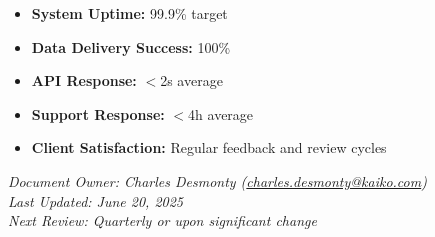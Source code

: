 \documentclass[12pt,a4paper]{article}
\begin{document}
\begin{itemize}[leftmargin=*]
    \item \textbf{System Uptime:} 99.9\% target
    \item \textbf{Data Delivery Success:} 100\%
    \item \textbf{API Response:} $<$2s average
    \item \textbf{Support Response:} $<$4h average
    \item \textbf{Client Satisfaction:} Regular feedback and review cycles
\end{itemize}

\vspace{1em}
\noindent\textit{Document Owner: Charles Desmonty (\href{mailto:charles.desmonty@kaiko.com}{charles.desmonty@kaiko.com}) \\
Last Updated: June 20, 2025 \\
Next Review: Quarterly or upon significant change}
\end{document}
